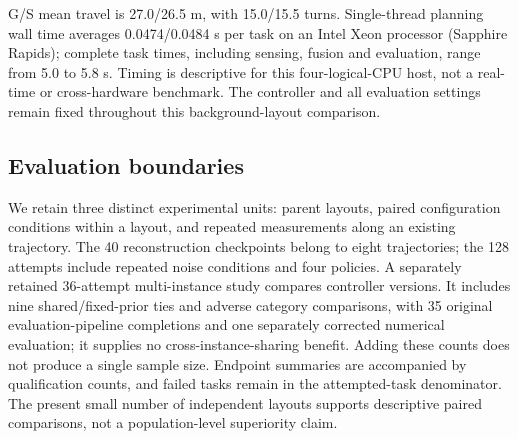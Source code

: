 G/S mean travel is 27.0/26.5 m, with 15.0/15.5 turns. Single-thread planning wall time averages 0.0474/0.0484 s per task on an Intel Xeon processor (Sapphire Rapids); complete task times, including sensing, fusion and evaluation, range from 5.0 to 5.8 s. Timing is descriptive for this four-logical-CPU host, not a real-time or cross-hardware benchmark. The controller and all evaluation settings remain fixed throughout this background-layout comparison.



\hypertarget{evaluation-boundaries}{%
\subsection{Evaluation boundaries}\label{evaluation-boundaries}}

We retain three distinct experimental units: parent layouts, paired configuration conditions within a layout, and repeated measurements along an existing trajectory. The 40 reconstruction checkpoints belong to eight trajectories; the 128 attempts include repeated noise conditions and four policies. A separately retained 36-attempt multi-instance study compares controller versions. It includes nine shared/fixed-prior ties and adverse category comparisons, with 35 original evaluation-pipeline completions and one separately corrected numerical evaluation; it supplies no cross-instance-sharing benefit. Adding these counts does not produce a single sample size. Endpoint summaries are accompanied by qualification counts, and failed tasks remain in the attempted-task denominator. The present small number of independent layouts supports descriptive paired comparisons, not a population-level superiority claim.


